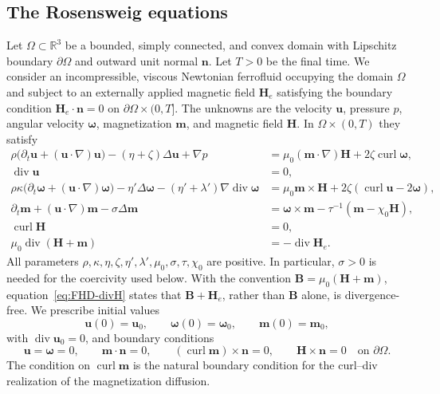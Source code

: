 \documentclass[11pt,a4paper]{article}
\newcommand{\bs}{\boldsymbol}
\DeclareMathOperator{\curl}{curl}
\DeclareMathOperator{\ddiv}{div}
\newcommand{\Div}{\ddiv}
\theoremstyle{definition}
\numberwithin{equation}{section}
\begin{document}
\subsection{The Rosensweig equations}
Let $\Omega\subset\mathbb R^3$ be a bounded, simply connected, and convex domain with Lipschitz boundary $\partial\Omega$ and outward unit normal $\bs n$. Let $T>0$ be the final time. We consider an incompressible, viscous Newtonian ferrofluid occupying the domain $\Omega$ and subject to an externally applied magnetic field $\bs H_e$ satisfying the boundary condition $\bs H_e\cdot \bs n = 0$ on $\partial\Omega \times (0,T]$.  The unknowns are the velocity $\bs u$, pressure $p$, angular velocity $\bs\omega$, magnetization $\bs m$, and magnetic field $\bs H$. In $\Omega\times(0,T)$ they satisfy
\begin{subequations}\label{eq:FHD}
\begin{align}
\rho\bigl(\partial_t\bs u+(\bs u\cdot\nabla)\bs u\bigr)
 -(\eta+\zeta)\Delta\bs u+\nabla p
 &=\mu_0(\bs m\cdot\nabla)\bs H+2\zeta\curl\bs\omega,\label{eq:FHD-u}\\
\Div\bs u&=0,\label{eq:FHD-divu}\\
\rho\kappa\bigl(\partial_t\bs\omega+(\bs u\cdot\nabla)\bs\omega\bigr)
 -\eta'\Delta\bs\omega-(\eta'+\lambda')\nabla\Div\bs\omega
 &=\mu_0\bs m\times\bs H+2\zeta(\curl\bs u-2\bs\omega),\label{eq:FHD-w}\\
\partial_t\bs m+(\bs u\cdot\nabla)\bs m-\sigma\Delta\bs m
 &=\bs\omega\times\bs m-\tau^{-1}(\bs m-\chi_0\bs H),\label{eq:FHD-m}\\
\curl\bs H&=0,\label{eq:FHD-curlH}\\
\mu_0\Div(\bs H+\bs m)&=-\Div\bs H_e.\label{eq:FHD-divH}
\end{align}
\end{subequations}
All parameters $\rho,\kappa,\eta,\zeta,\eta',\lambda',\mu_0,\sigma,\tau,\chi_0$ are positive. In particular, $\sigma>0$ is needed for the coercivity used below. With the convention $\bs B=\mu_0(\bs H+\bs m)$, equation~\eqref{eq:FHD-divH} states that $\bs B+\bs H_e$, rather than $\bs B$ alone, is divergence-free.
%
We prescribe initial values 
\begin{equation}\label{eq:initial-FHD}
\bs u(0) = \bs u_0,\qquad\bs\omega(0) = \bs\omega_0,\qquad\bs m(0) = \bs m_0,
\end{equation} 
with $\Div\bs u_0=0$, and boundary conditions
\begin{equation}\label{eq:bc}
 \bs u=\bs\omega=0,\qquad \bs m\cdot\bs n=0,\qquad
 (\curl\bs m)\times\bs n=0,\qquad \bs H\times\bs n=0
 \quad\text{on }\partial\Omega.
\end{equation}
The condition on $\curl\bs m$ is the natural boundary condition for the curl--div realization of the magnetization diffusion. 
\end{document}
